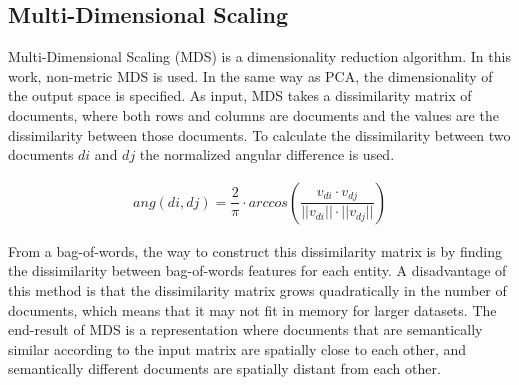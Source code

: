 \subsection{Multi-Dimensional Scaling}\label{ch2:MDS}


Multi-Dimensional Scaling  (MDS) is a dimensionality reduction algorithm. In this work, non-metric MDS is used. In the same way as PCA, the dimensionality of the output space is specified. As input, MDS takes a dissimilarity matrix of documents, where both rows and columns are documents and the values are the dissimilarity between those documents. To calculate the dissimilarity between two documents $di$ and $dj$ the normalized angular difference is used.

\begin{align}
ang(di, dj) = \dfrac{2}{\pi} \cdot \textit{arccos}(\dfrac{v_{di} \cdot v_{dj}}{|| v_{di} || \cdot || v_{dj} ||})
\end{align}

From a bag-of-words, the way to construct this dissimilarity matrix is by finding the dissimilarity between bag-of-words features for each entity. A disadvantage of this method is that the dissimilarity matrix grows quadratically in the number of documents, which means that it may not fit in memory for larger datasets. The end-result of MDS is a representation where documents that are semantically similar according to the input matrix are spatially close to each other, and semantically different documents are spatially distant from each other.






